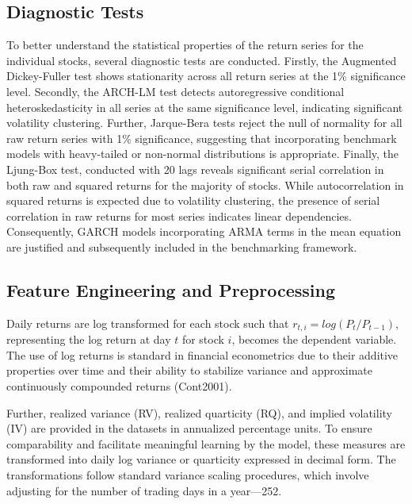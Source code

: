 \subsection{Diagnostic Tests}
\label{sec:diagnostic_tests}
To better understand the statistical properties of the return series for the individual stocks, several diagnostic tests are conducted. Firstly, the Augmented Dickey-Fuller \parencite{Dickey1981} test shows stationarity across all return series at the 1\% significance level. Secondly, the ARCH-LM test \parencite{Engle1982} detects autoregressive conditional heteroskedasticity in all series at the same significance level, indicating  significant volatility clustering. Further, Jarque-Bera \parencite{Jarque1980} tests reject the null of normality for all raw return series with 1\% significance, suggesting that incorporating benchmark models with heavy-tailed or non-normal distributions is appropriate. Finally, the Ljung-Box \parencite{LJUNG1978} test, conducted with 20 lags reveals significant serial correlation in both raw and squared returns for the majority of stocks. While autocorrelation in squared returns is expected due to volatility clustering, the presence of serial correlation in raw returns for most series indicates linear dependencies. Consequently, GARCH models incorporating ARMA terms in the mean equation are justified and subsequently included in the benchmarking framework.

\subsection{Feature Engineering and Preprocessing}
\label{sec:feature_engineering}
Daily returns are log transformed for each stock such that $r_{t,i} = log(P_t/P_{t-1})$, representing the log return at day $t$ for stock $i$, becomes the dependent variable. The use of log returns is standard in financial econometrics due to their additive properties over time and their ability to stabilize variance and approximate continuously compounded returns (Cont2001).

Further, realized variance (RV), realized quarticity (RQ), and implied volatility (IV) are provided in the datasets in annualized percentage units. To ensure comparability and facilitate meaningful learning by the model, these measures are transformed into daily log variance or quarticity expressed in decimal form. The transformations follow standard variance scaling procedures, which involve adjusting for the number of trading days in a year—252.

